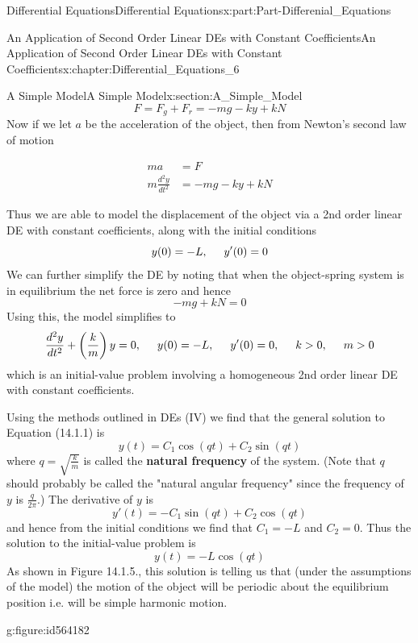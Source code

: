 \documentclass[oneside,10pt,]{book}
\newcommand{\terminology}[1]{\textbf{#1}}
\numberwithin{equation}{section}
\newcommand{\amp}{&}
\begin{document}
\begin{partptx}{Differential Equations}{}{Differential Equations}{}{}{x:part:Part-Differenial_Equations}
\begin{chapterptx}{An Application of Second Order Linear DEs with Constant Coefficients}{}{An Application of Second Order Linear DEs with Constant Coefficients}{}{}{x:chapter:Differential_Equations_6}
\begin{sectionptx}{A Simple Model}{}{A Simple Model}{}{}{x:section:A_Simple_Model}
\begin{equation*}
F=F_g+F_r=-mg-ky+kN
\end{equation*}
Now if we let \(a\) be the acceleration of the object, then from Newton’s second law of motion%
\par
%
\begin{align*}
ma \amp=F\\
m\frac{d^2y}{dt^2} \amp=-mg-ky+kN
\end{align*}
%
\par
Thus we are able to model the displacement of the object via a 2nd order linear DE with constant coefficients, along with the initial conditions%
\begin{equation*}
y(0)=-L,\hspace{5mm} y'(0)=0
\end{equation*}
We can further simplify the DE by noting that when the object-spring system is in equilibrium the net force is zero and hence%
\begin{equation*}
-mg+kN=0
\end{equation*}
Using this, the model simplifies to%
\begin{equation}
\frac{d^2y}{dt^2}+\left(\frac{k}{m}\right)y=0, \hspace{5mm}y(0)=-L, \hspace{5mm}y'(0)=0,\hspace{5mm} k>0,\hspace{5mm} m>0\label{g:men:id564142}
\end{equation}
which is an initial-value problem involving a homogeneous 2nd order linear DE with constant coefficients.%
\par
Using the methods outlined in DEs (IV) we find that the general solution to Equation (14.1.1) is%
\begin{equation*}
y(t)=C_1\cos(qt)+C_2\sin(qt)
\end{equation*}
where \(q=\sqrt{\frac{k}{m}}\) is called the \terminology{natural frequency} of the system. (Note that \(q\) should probably be called the "natural angular frequency" since the frequency of \(y\) is \(\frac{q}{2\pi}\).) The derivative of \(y\) is%
\begin{equation*}
y'(t)=-C_1\sin(qt)+C_2\cos(qt)
\end{equation*}
and hence from the initial conditions we find that \(C_1=-L\) and \(C_2=0\). Thus the solution to the initial-value problem is%
\begin{equation*}
y(t)=-L\cos(qt)
\end{equation*}
As shown in Figure 14.1.5., this solution is telling us that (under the assumptions of the model) the motion of the object will be periodic about the equilibrium position i.e. will be simple harmonic motion. \begin{figureptx}{}{g:figure:id564182}{}%

\end{figureptx}
\end{sectionptx}
\end{chapterptx}
\end{partptx}
\end{document}
